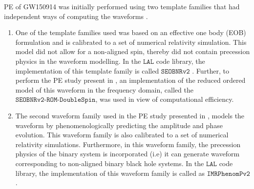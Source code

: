 
PE of GW150914 was initially performed using two template families that had independent ways of computing the waveforms \cite{gw150914PE}.
\begin{enumerate}
\item One of the template families used was based on an effective one body (EOB) formulation and is calibrated to a set of numerical relativity simulation. This model did not allow for a non-aligned spin, thereby did not contain precession physics in the waveform modelling. In the $\texttt{LAL}$ code library, the implementation of this template family is called $\texttt{SEOBNRv2}$  \cite{SEOBNRv2}. Further, to perform the PE study present in \cite{gw150914PE}, an implementation of the reduced ordered model of this waveform in the frequency domain, called the $\texttt{SEOBNRv2-ROM-DoubleSpin}$,  was used in view of computational efficiency. 
\item The second waveform family used in the PE study presented in \cite{gw150914PE}, models the waveform by phenomenologically predicting the amplitude and phase evolution.  This waveform family is also calibrated to a set of numerical relativity simulations. Furthermore, in this waveform family, the precession physics of the binary system is incorporated (i.e) it can generate waveform corresponding to non-aligned binary black hole systems.  In the $\texttt{LAL}$ code library,  the implementation of this waveform family is called as $\texttt{IMRPhenomPv2}$  \cite{IMRPhenomPv2}. 
\end{enumerate}

